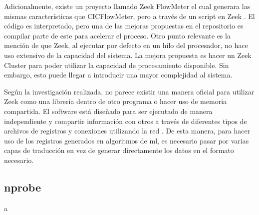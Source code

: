 Adicionalmente, existe un proyecto llamado Zeek FlowMeter el cual generara las mismas características que CICFlowMeter, pero a través de un script en Zeek \cite{zeek_flowmeter}. El código es interpretado, pero una de las mejoras propuestas en el repositorio es compilar parte de este para acelerar el proceso. Otro punto relevante es la mención de que Zeek, al ejecutar por defecto en un hilo del procesador, no hace uso extensivo de la capacidad del sistema. La mejora propuesta es hacer un Zeek Cluster \cite{zeek_documentation_cluster} para poder utilizar la capacidad de procesamiento disponible. Sin embargo, esto puede llegar a introducir una mayor complejidad al sistema.

Según la investigación realizada, no parece existir una manera oficial para utilizar Zeek como una librería dentro de otro programa o hacer uso de memoria compartida. El software está diseñado para ser ejecutado de manera independiente y compartir información con otros a través de diferentes tipos de archivos de registros \cite{zeek_documentation_logging} y conexiones utilizando la red \cite{zeek_documentation_logwriters}. De esta manera, para hacer uso de los registros generados en algoritmos de \gls{ml}, es necesario pasar por varias capas de traducción en vez de generar directamente los datos en el formato necesario.

\subsection{nprobe}

a
